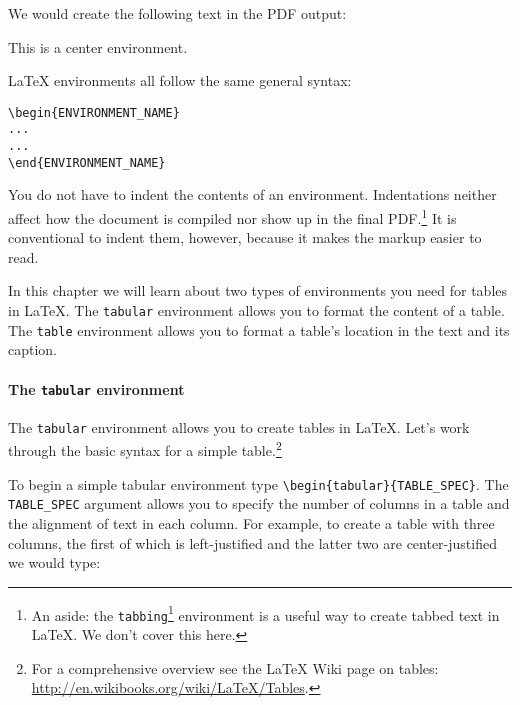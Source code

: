 \noindent We would create the following text in the PDF output:

\begin{center}
    This is a center environment.
\end{center}

\noindent LaTeX environments all follow the same general syntax:

\begin{knitrout}
\color{fgcolor}\begin{kframe}
\begin{alltt}
\textbackslash{}begin\{ENVIRONMENT_NAME\}
    . . .
    . . .
\textbackslash{}end\{ENVIRONMENT_NAME\}
\end{alltt}
\end{kframe}
\end{knitrout}


\noindent You do not have to indent the contents of an environment. Indentations neither affect how the document is compiled nor show up in the final PDF.\footnote{An aside: the \texttt{tabbing}\footnote{tabbing, LaTeX environment} environment is a useful way to create tabbed text in LaTeX. We don't cover this here.} It is conventional to indent them, however, because it makes the markup easier to read.

In this chapter we will learn about two types of environments you need for tables in LaTeX. The \texttt{tabular} environment allows you to format the content of a table. The \texttt{table} environment allows you to format a table's location in the text and its caption.

\paragraph{The \texttt{tabular} environment}

The \texttt{tabular} environment allows you to create tables in LaTeX. Let's work through the basic syntax for a simple table.\footnote{For a comprehensive overview see the LaTeX Wiki page on tables: \url{http://en.wikibooks.org/wiki/LaTeX/Tables}.} 

To begin a simple tabular environment type \verb|\begin{tabular}{TABLE_SPEC}|. The \verb|TABLE_SPEC| argument allows you to specify the number of columns in a table and the alignment of text in each column. For example, to create a table with three columns, the first of which is left-justified and the latter two are center-justified we would type:

